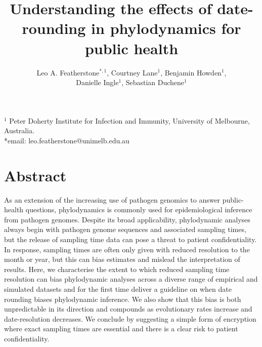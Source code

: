 \documentclass{article}
\title{Understanding the effects of date-rounding in phylodynamics for public health}
\author{Leo A. Featherstone$^{\ast,1}$, Courtney Lane$^{1}$, Benjamin Howden$^{1}$,\\Danielle Ingle$^{1}$, Sebastian Duchene$^{1}$}
\begin{document}
\maketitle
\linenumbers
$^{1}$ Peter Doherty Institute for Infection and Immunity, University of Melbourne, Australia.\\
*email: leo.featherstone@unimelb.edu.au

\section*{Abstract}
As an extension of the increasing use of pathogen genomics to answer public-health questions, phylodynamics is commonly used for epidemiological inference from pathogen genomes. Despite its broad applicability, phylodynamic analyses always begin with pathogen genome sequences and associated sampling times, but the release of sampling time data can pose a threat to patient confidentiality. In response, sampling times are often only given with reduced resolution to the month or year, but this can bias estimates and mislead the interpretation of results. Here, we characterise the extent to which reduced sampling time resolution can bias phylodynamic analyses across a diverse range of empirical and simulated datasets and for the first time deliver a guideline on when date rounding biases phylodynamic inference. We also show that this bias is both unpredictable in its direction and compounds as evolutionary rates increase and date-resolution decreases. We conclude by suggesting a simple form of encryption where exact sampling times are essential and there is a clear risk to patient confidentiality.
\end{document}
